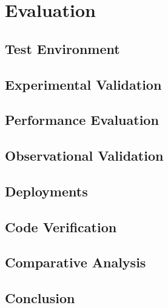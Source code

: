\acresetall

\chapter{Evaluation}\label{chapter:evaluation}
\doit

\section{Test Environment}
\doit

\section{Experimental Validation}
\doit

\section{Performance Evaluation}
\doit

\section{Observational Validation}
\doit

\section{Deployments}
\doit

\section{Code Verification}
\doit

\section{Comparative Analysis}
\doit

\section{Conclusion}
\doit
